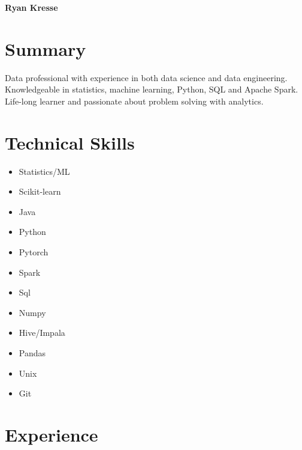 \documentclass[11pt]{article}
\begin{document}
	\noindent \textbf{{\fontsize{38pt}{\parskip}\selectfont \color{RyanRed} Ryan Kresse}}
	\smallskip


	\section{Summary}
	Data professional with experience in both data science and data engineering. Knowledgeable in statistics, machine learning, Python, SQL and Apache Spark. Life-long learner and passionate about problem solving with analytics.
	\section{Technical Skills}
		\begin{multicols}{4}
				\begin{itemize}
				\item Statistics/ML
				\item Scikit-learn
				\item Java

				\columnbreak
				\item Python
				\item Pytorch
				\item Spark

				\columnbreak
				\item Sql
				\item Numpy
				\item Hive/Impala

				\columnbreak
				\item Pandas
				\item Unix
				\item Git
				\columnbreak

			\end{itemize}
		\end{multicols}



	\section{Experience}
\end{document}
